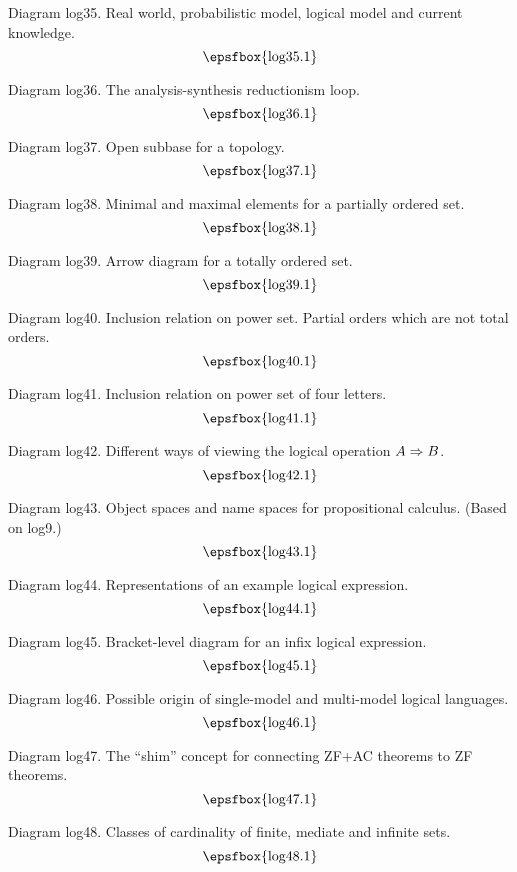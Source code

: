 Diagram log35. Real world, probabilistic model, logical model and current
knowledge.
$$
\centerline{\epsfbox{log35.1}}
$$

Diagram log36. The analysis-synthesis reductionism loop.
$$
\centerline{\epsfbox{log36.1}}
$$

\filleject

Diagram log37. Open subbase for a topology.
$$
\centerline{\epsfbox{log37.1}}
$$

Diagram log38. Minimal and maximal elements for a partially ordered set.
$$
\centerline{\epsfbox{log38.1}}
$$

Diagram log39. Arrow diagram for a totally ordered set.
$$
\centerline{\epsfbox{log39.1}}
$$

Diagram log40. Inclusion relation on power set. Partial orders which are not
total orders.
$$
\centerline{\epsfbox{log40.1}}
$$

Diagram log41. Inclusion relation on power set of four letters.
$$
\centerline{\epsfbox{log41.1}}
$$

\filleject

Diagram log42. Different ways of viewing the logical operation $A\mathrel{\Rightarrow} B$.
$$
\centerline{\epsfbox{log42.1}}
$$

Diagram log43. Object spaces and name spaces for propositional calculus. (Based
on log9.)
$$
\centerline{\epsfbox{log43.1}}
$$

Diagram log44. Representations of an example logical expression.
$$
\centerline{\epsfbox{log44.1}}
$$

\filleject

Diagram log45. Bracket-level diagram for an infix logical expression.
$$
\centerline{\epsfbox{log45.1}}
$$

Diagram log46. Possible origin of single-model and multi-model logical
languages.
$$
\centerline{\epsfbox{log46.1}}
$$

Diagram log47. The ``shim'' concept for connecting ZF+AC theorems to ZF
theorems.
$$
\centerline{\epsfbox{log47.1}}
$$

Diagram log48. Classes of cardinality of finite, mediate and infinite sets.
$$
\centerline{\epsfbox{log48.1}}
$$

\filleject

